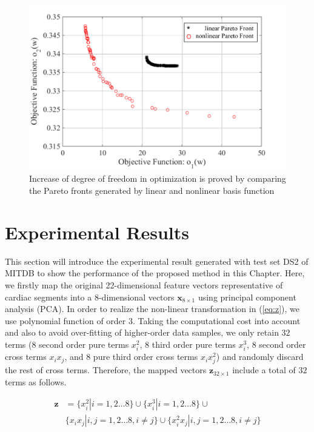 \begin{figure}[t]
\centering
\includegraphics[scale=.6]{Fig/pareto_compare.pdf}
\caption{Increase of degree of freedom in optimization is proved by comparing the Pareto fronts generated by linear and nonlinear basis function}
\label{fig:pareto_compare}
\end{figure}

\section{Experimental Results}\label{sec:result1}

This section will introduce the experimental result generated with test set DS2 of MITDB to show the performance of the proposed method in this Chapter. Here, we firstly map the original 22-dimensional feature vectors representative of cardiac segments into a 8-dimensional vectors $\mathbf{x}_{8 \times 1}$ using principal component analysis (PCA). 
In order to realize the non-linear transformation in (\ref{eq:z}), we use polynomial function of order $3$. Taking the computational cost into account and also to avoid over-fitting of higher-order data samples, we only retain $32$ terms (8 second order pure terms $x_i^2$, 8 third order pure terms $x_i^3$, 8 second order cross terms $x_ix_j$, and 8 pure third order cross terms $x_i x_j^2$) and randomly discard the rest of cross terms. Therefore, the mapped vectors $\mathbf{z}_{32 \times 1}$ include a total of $32$ terms as follows.

\begin{align}
\label{eq:8-32}
\mathbf{z}&=\{x_i^2|i=1,2\dots 8\}\cup\{x_i^3|i=1,2\dots 8\} \cup\\
\nonumber
& \{x_ix_j|i,j=1,2\dots 8,i\neq j\} \cup  \{  x_i^2x_j | i,j=1,2\dots 8,i\neq j \}
\end{align}

